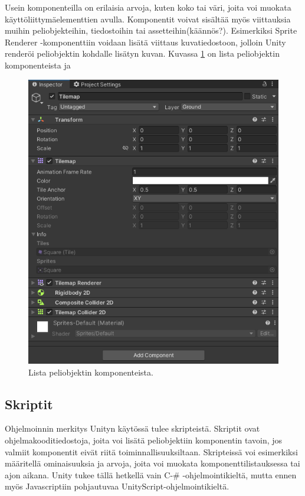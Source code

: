 \documentclass[utf8]{gradu3}
\begin{document}
Usein komponenteilla on erilaisia arvoja, kuten koko tai väri, joita voi muokata käyttöliittymäelementtien avulla. Komponentit voivat sisältää myös viittauksia muihin peliobjekteihin, tiedostoihin tai assetteihin(käännös?). Esimerkiksi Sprite Renderer -komponenttiin voidaan lisätä viittaus kuvatiedostoon, jolloin Unity renderöi peliobjektin kohdalle lisätyn kuvan. Kuvassa \ref{komponenttikuva} on lista peliobjektin komponenteista ja 

\begin{figure}[t]
\centering
\includegraphics[width=14.8cm]{komponenttilistaus.png}
\caption{Lista peliobjektin komponenteista.}
\label{komponenttikuva}
\end{figure}

\subsection{Skriptit}

Ohjelmoinnin merkitys Unityn käytössä tulee skripteistä. Skriptit ovat ohjelmakooditiedostoja, joita voi lisätä peliobjektiin komponentin tavoin, jos valmiit komponentit eivät riitä toiminnallisuuksiltaan. Skripteissä voi esimerkiksi määritellä ominaisuuksia ja arvoja, joita voi muokata komponenttilistauksessa tai ajon aikana. Unity tukee tällä hetkellä vain C-\# -ohjelmointikieltä, mutta ennen myös Javascriptiin pohjautuvaa UnityScript-ohjelmointikieltä.
\end{document}
